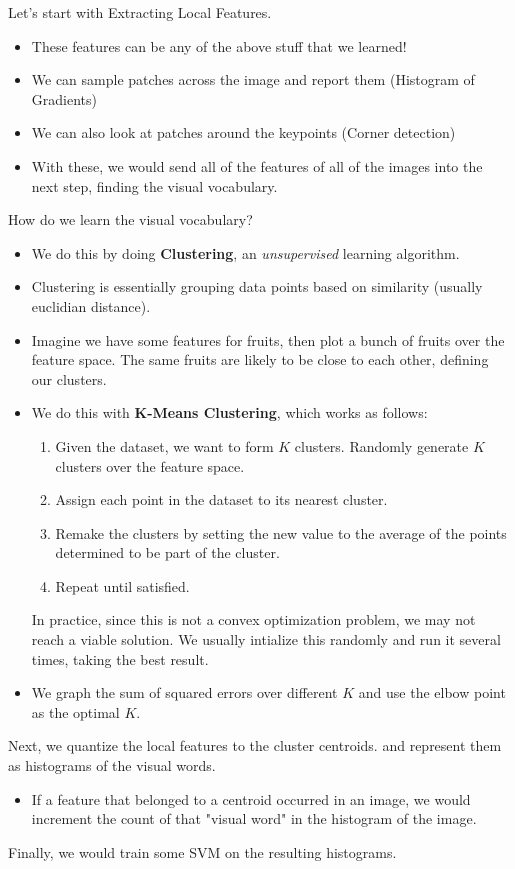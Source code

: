 \documentclass{article}
\begin{document}
Let's start with Extracting Local Features. 
\begin{itemize}
    \item These features can be any of the above stuff that we learned!
    \item We can sample patches across the image and report them (Histogram of Gradients)
    \item We can also look at patches around the keypoints (Corner detection)
    \item With these, we would send all of the features of all of the images into the next step, finding the visual vocabulary. 
\end{itemize}
How do we learn the visual vocabulary?
\begin{itemize}
    \item We do this by doing \textbf{Clustering}, an \textit{unsupervised} learning algorithm. 
    \item Clustering is essentially grouping data points based on similarity (usually euclidian distance). 
    \item Imagine we have some features for fruits, then plot a bunch of fruits over the feature space. The same fruits are likely to be close to each other, defining our clusters.
    \item We do this with \textbf{K-Means Clustering}, which works as follows:
    \begin{enumerate}
        \item Given the dataset, we want to form $K$ clusters. Randomly generate $K$ clusters over the feature space.
        \item Assign each point in the dataset to its nearest cluster. 
        \item Remake the clusters by setting the new value to the average of the points determined to be part of the cluster.
        \item Repeat until satisfied.
    \end{enumerate}
    In practice, since this is not a convex optimization problem, we may not reach a viable solution. We usually intialize this randomly and run it several times, taking the best result. 
    \item We graph the sum of squared errors over different $K$ and use the elbow point as the optimal $K$.
\end{itemize}
Next, we quantize the local features to the cluster centroids. and represent them as histograms of the visual words. 
\begin{itemize}
    \item If a feature that belonged to a centroid occurred in an image, we would increment the count of that "visual word" in the histogram of the image. 
\end{itemize}
Finally, we would train some SVM on the resulting histograms.
\end{document}
